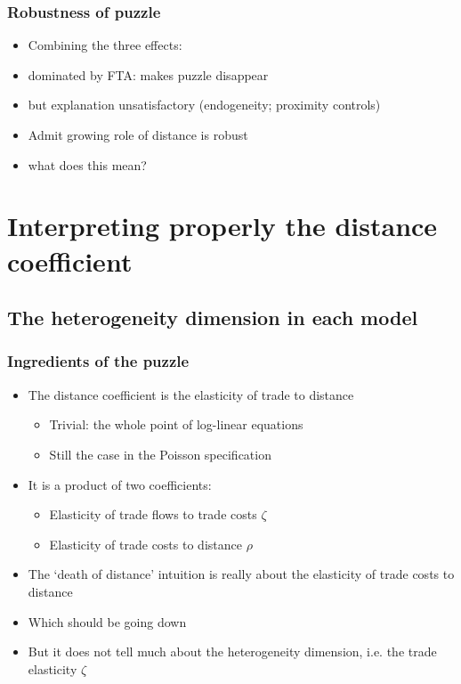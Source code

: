 \documentclass{beamer}
\begin{document}
\begin{frame}[plain]\frametitle{Robustness of puzzle}
\vspace{0.3cm}
\begin{itemize}
\item Combining the three effects:
\item dominated by FTA: makes puzzle disappear
\item but explanation unsatisfactory (endogeneity; proximity controls)
\vspace{.3cm}
\item Admit growing role of distance is robust
\item what does this mean?
\end{itemize}
\end{frame}
\fi

\section{Interpreting properly the distance coefficient}
\subsection{The heterogeneity dimension in each model}
\begin{frame}\frametitle{Ingredients of the puzzle}
\begin{itemize}
\vspace{0.3cm}
\item The distance coefficient is the elasticity of trade to distance
\begin{itemize}
\item Trivial: the whole point of log-linear equations
\item Still the case in the Poisson specification
\end{itemize}
\vspace{0.3cm}
\item It is a product of two coefficients:
\begin{itemize}
\item Elasticity of trade flows to trade costs $\zeta$
\item Elasticity of trade costs to distance $\rho$
\end{itemize}
\vspace{0.3cm}
\item The `death of distance' intuition is really about the elasticity of trade costs to distance
\item Which should be going down
\item But it does not tell much about the heterogeneity dimension, i.e. the trade elasticity $\zeta$
\end{itemize}
\end{frame}
\end{document}
